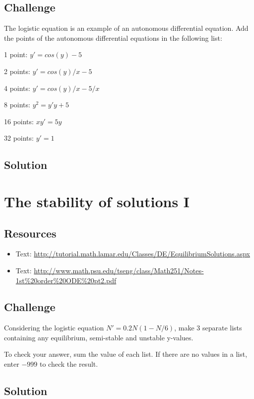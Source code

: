 \subsection*{Challenge}
The logistic equation is an example of an autonomous differential equation.
Add the points of the autonomous differential equations in the following list:

1 point: $y' = cos(y)-5$

2 points: $y' = cos(y)/x - 5$

4 points: $y' = cos(y)/x - 5/x$

8 points: $y^2 = y' y+5$

16 points: $x y' = 5 y$

32 points: $y' = 1$

\subsection*{Solution}


\newpage
\section{The stability of solutions I}

\subsection*{Resources}
\begin{itemize}
    \item Text: \url{http://tutorial.math.lamar.edu/Classes/DE/EquilibriumSolutions.aspx}
    \item Text: \url{http://www.math.psu.edu/tseng/class/Math251/Notes-1st\%20order\%20ODE\%20pt2.pdf}
\end{itemize}

\subsection*{Challenge}
Considering the logistic equation $N'=0.2N(1-N/6)$, make 3 separate lists containing any equilibrium, semi-stable and unstable y-values.

To check your answer, sum the value of each list. If there are no values in a list, enter $-999$ to check the result.

\subsection*{Solution}
